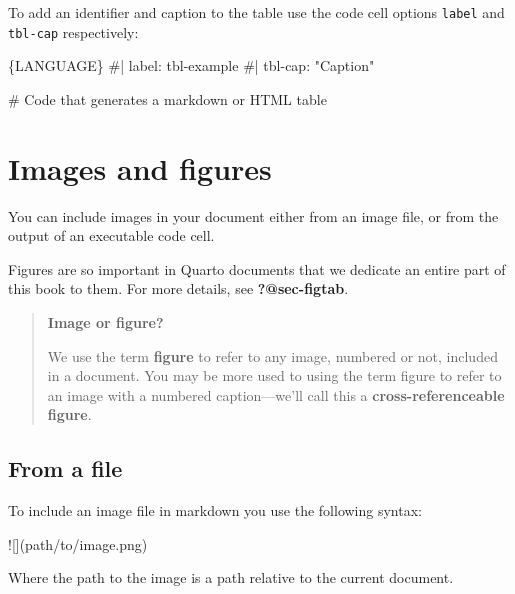 \documentclass[
  letterpaper,
  DIV=11,
  numbers=noendperiod,
  oneside]{scrreprt}
\newenvironment{Shaded}{\begin{snugshade}}{\end{snugshade}}
\newcommand{\AlertTok}[1]{\textcolor[rgb]{0.68,0.00,0.00}{#1}}
\newcommand{\InformationTok}[1]{\textcolor[rgb]{0.37,0.37,0.37}{#1}}
\begin{document}
\begin{tcolorbox}
To add an identifier and caption to the table use the code cell options
\texttt{label} and \texttt{tbl-cap} respectively:

\begin{Shaded}
\begin{Highlighting}[]
\InformationTok{\textasciigrave{}\textasciigrave{}\textasciigrave{}\{LANGUAGE\}}
\InformationTok{\#| label: tbl{-}example}
\InformationTok{\#| tbl{-}cap: "Caption"}

\InformationTok{\# Code that generates a markdown or HTML table}
\InformationTok{\textasciigrave{}\textasciigrave{}\textasciigrave{}}
\end{Highlighting}
\end{Shaded}

\section{Images and figures}\label{sec-markdown-figures}

You can include images in your document either from an image file, or
from the output of an executable code cell.

Figures are so important in Quarto documents that we dedicate an entire
part of this book to them. For more details, see \textbf{?@sec-figtab}.

\begin{quote}
\textbf{Image or figure?}

We use the term \textbf{figure} to refer to any image, numbered or not,
included in a document. You may be more used to using the term figure to
refer to an image with a numbered caption---we'll call this a
\textbf{cross-referenceable figure}.
\end{quote}

\subsection{From a file}\label{from-a-file}

To include an image file in markdown you use the following syntax:

\begin{Shaded}
\begin{Highlighting}[]
\AlertTok{![](path/to/image.png)}
\end{Highlighting}
\end{Shaded}

Where the path to the image is a path relative to the current document.


\end{tcolorbox}
\end{document}
